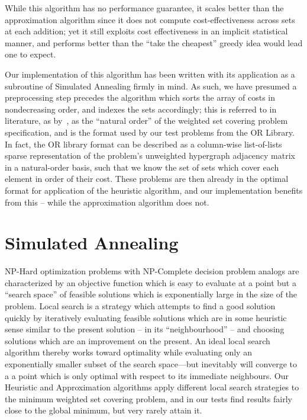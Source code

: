 While this algorithm has no performance guarantee, it scales better than the approximation algorithm since it does not compute cost-effectiveness across sets at each addition; yet it still exploits cost effectiveness in an implicit statistical manner, and performs better than the ``take the cheapest'' greedy idea would lead one to expect.

Our implementation of this algorithm has been written with its application as a subroutine of Simulated Annealing firmly in mind. As such, we have presumed a preprocessing step precedes the algorithm which sorts the array of costs in nondecreasing order, and indexes the sets accordingly; this is referred to in literature, \eg as by~\cite{JacobsBrusco}, as the ``natural order'' of the weighted set covering problem specification, and is the format used by our test problems from the OR Library. In fact, the OR library format can be described as a column-wise list-of-lists sparse representation of the problem's unweighted hypergraph adjacency matrix in a natural-order basis, such that we know the set of sets which cover each element in order of their cost. These problems are then already in the optimal format for application of the heuristic algorithm, and our implementation benefits from this -- while the approximation algorithm does not.

\section{Simulated Annealing}

NP-Hard optimization problems with NP-Complete decision problem analogs are characterized by an objective function which is easy to evaluate at a point but a ``search space'' of feasible solutions which is exponentially large in the size of the problem. Local search is a strategy which attempts to find a good solution quickly by iteratively evaluating feasible solutions which are in some heuristic sense similar to the present solution -- in its ``neighbourhood'' -- and choosing solutions which are an improvement on the present. An ideal local search algorithm thereby works toward optimality while evaluating only an exponentially smaller subset of the search space---but inevitably will converge to a a point which is only optimal with respect to its immediate neighbours. Our Heuristic and Approximation algorithms apply different local search strategies to the minimum weighted set covering problem, and in our tests find results fairly close to the global minimum, but very rarely attain it.

